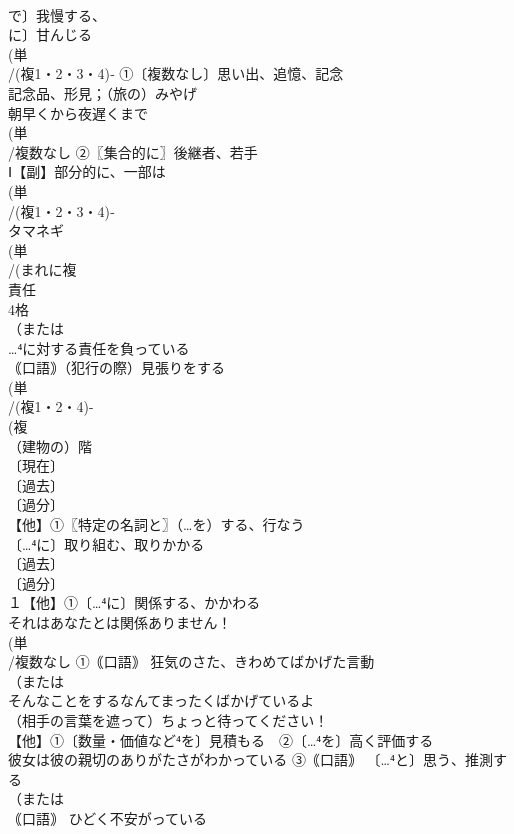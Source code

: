 \documentclass[8pt]{extreport}
\begin{document}
\begin{CJK}{UTF8}{min}
\\	で〕我慢する、
\\	に〕甘んじる
\\	(単
\\	/(複1・2・3・4)‐ ①〔複数なし〕思い出、追憶、記念 
\\	記念品、形見；（旅の）みやげ 
\\	朝早くから夜遅くまで
\\	(単
\\	/複数なし ②〖集合的に〗後継者、若手
\\	Ⅰ【副】部分的に、一部は 
\\	(単
\\	/(複1・2・3・4)‐
\\	タマネギ 
\\	(単
\\	/(まれに複
\\	責任 
\\	4格 
\\	（または
\\	…⁴に対する責任を負っている 
\\	｟口語｠（犯行の際）見張りをする
\\	(単
\\	/(複1・2・4)-
\\	(複
\\	（建物の）階 
\\	〔現在〕
\\	〔過去〕
\\	〔過分〕
\\	【他】①〖特定の名詞と〗（…を）する、行なう 
\\	〔…⁴に〕取り組む、取りかかる
\\	〔過去〕
\\	〔過分〕
\\	１【他】①〔…⁴に〕関係する、かかわる 
\\	それはあなたとは関係ありません！ 
\\	(単
\\	/複数なし ①｟口語｠ 狂気のさた、きわめてばかげた言動 
\\	（または
\\	そんなことをするなんてまったくばかげているよ
\\	（相手の言葉を遮って）ちょっと待ってください！
\\	【他】①〔数量・価値など⁴を〕見積もる　②〔…⁴を〕高く評価する 
\\	彼女は彼の親切のありがたさがわかっている ③｟口語｠ 〔…⁴と〕思う、推測する
\\	（または
\\	｟口語｠ ひどく不安がっている

\end{CJK}
\end{document}
